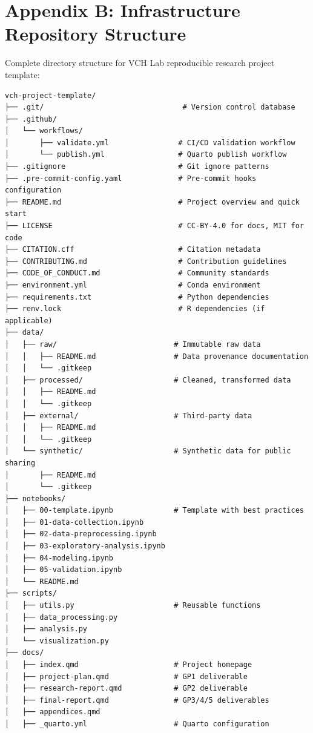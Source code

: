 \documentclass[
  oneside,
  open=any]{scrbook}
\begin{document}
\section{Appendix B: Infrastructure Repository
Structure}\label{appendix-b-infrastructure-repository-structure}

Complete directory structure for VCH Lab reproducible research project
template:

\begin{verbatim}
vch-project-template/
├── .git/                                # Version control database
├── .github/
│   └── workflows/
│       ├── validate.yml                # CI/CD validation workflow
│       └── publish.yml                 # Quarto publish workflow
├── .gitignore                          # Git ignore patterns
├── .pre-commit-config.yaml             # Pre-commit hooks configuration
├── README.md                           # Project overview and quick start
├── LICENSE                             # CC-BY-4.0 for docs, MIT for code
├── CITATION.cff                        # Citation metadata
├── CONTRIBUTING.md                     # Contribution guidelines
├── CODE_OF_CONDUCT.md                  # Community standards
├── environment.yml                     # Conda environment
├── requirements.txt                    # Python dependencies
├── renv.lock                           # R dependencies (if applicable)
├── data/
│   ├── raw/                           # Immutable raw data
│   │   ├── README.md                  # Data provenance documentation
│   │   └── .gitkeep
│   ├── processed/                     # Cleaned, transformed data
│   │   ├── README.md
│   │   └── .gitkeep
│   ├── external/                      # Third-party data
│   │   ├── README.md
│   │   └── .gitkeep
│   └── synthetic/                     # Synthetic data for public sharing
│       ├── README.md
│       └── .gitkeep
├── notebooks/
│   ├── 00-template.ipynb              # Template with best practices
│   ├── 01-data-collection.ipynb
│   ├── 02-data-preprocessing.ipynb
│   ├── 03-exploratory-analysis.ipynb
│   ├── 04-modeling.ipynb
│   ├── 05-validation.ipynb
│   └── README.md
├── scripts/
│   ├── utils.py                       # Reusable functions
│   ├── data_processing.py
│   ├── analysis.py
│   └── visualization.py
├── docs/
│   ├── index.qmd                      # Project homepage
│   ├── project-plan.qmd               # GP1 deliverable
│   ├── research-report.qmd            # GP2 deliverable
│   ├── final-report.qmd               # GP3/4/5 deliverables
│   ├── appendices.qmd
│   ├── _quarto.yml                    # Quarto configuration

\end{verbatim}
\end{document}
